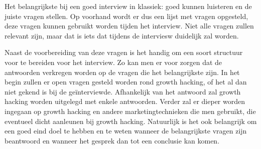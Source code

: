 Het belangrijkste bij een goed interview in klassiek: goed kunnen luisteren en de juiste vragen stellen. Op voorhand wordt er dus een lijst met vragen opgesteld, deze vragen kunnen gebruikt worden tijden het interview. Niet alle vragen zullen relevant zijn, maar dat is iets dat tijdens de interviesw duidelijk zal worden.

Naast de voorbereiding van deze vragen is het handig om een soort structuur voor te bereiden voor het interview. Zo kan men er voor zorgen dat de antwoorden verkregen worden op de vragen die het belangrijkste zijn. In het begin zullen er open vragen gesteld worden rond growth hacking, of het al dan niet gekend is bij de geïnterviewde. Afhankelijk van het antwoord zal growth hacking worden uitgelegd met enkele antwoorden. Verder zal er dieper worden ingegaan op growth hacking en andere marketingtechnieken die men gebruikt, die eventueel dicht aanleunen bij growth hacking. Natuurlijk is het ook belangrijk om een goed eind doel te hebben en te weten wanneer de belangrijkste vragen zijn beantwoord en wanneer het gesprek dan tot een conclusie kan komen.

